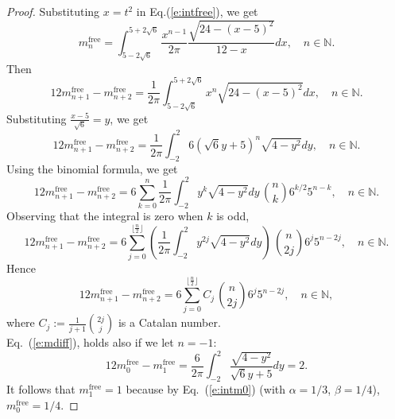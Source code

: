 \documentclass{amsart}
\newcommand{\N}{\mathbb N}
\theoremstyle{definition}
\begin{document}
\begin{proof}
Substituting   $x=t^2$ in Eq.(\ref{e:intfree}), we get
$$m_n^{\mathrm{free}}=\int_{5-2\sqrt{6}}^{5+2\sqrt{6}} \frac{x^{n-1}}{2\pi}\frac{\sqrt{24-(x-5)^2}}{12-x}dx,\quad n\in\N.$$
Then
$$12m_{n+1}^{\mathrm{free}}-m_{n+2}^{\mathrm{free}}=\frac{1}{2\pi}\int_{5-2\sqrt{6}}^{5+2\sqrt{6}} x^{n}\sqrt{24-(x-5)^2}dx,\quad n\in\N.$$
Substituting $\frac{x-5}{\sqrt{6}}=y$, we get
\begin{equation}\label{e:mdiff}
12m_{n+1}^{\mathrm{free}}-m_{n+2}^{\mathrm{free}}=\frac{1}{2\pi}\int_{-2}^{2} 6(\sqrt{6}y+5)^{n}\sqrt{4-y^2}dy,\quad n\in\N.
\end{equation}
Using the binomial formula, we get
$$12m_{n+1}^{\mathrm{free}}-m_{n+2}^{\mathrm{free}}=6\sum_{k=0}^{n}\frac{1}{2\pi}\int_{-2}^{2} y^k\sqrt{4-y^2}dy\, \binom{n}{k}6^{k/2}5^{n-k} ,\quad n\in\N.$$
Observing that the integral is zero when $k$ is odd,
$$12m_{n+1}^{\mathrm{free}}-m_{n+2}^{\mathrm{free}}=6\sum_{j=0}^{\lfloor\frac n 2 \rfloor}\left(\frac{1}{2\pi}\int_{-2}^{2} y^{2j}\sqrt{4-y^2}dy\right)\, \binom{n}{2j}6^{j}5^{n-2j} ,\quad n\in\N.$$
Hence
$$12m_{n+1}^{\mathrm{free}}-m_{n+2}^{\mathrm{free}}=6\sum_{j=0}^{\lfloor\frac n 2 \rfloor}C_j\, \binom{n}{2j}6^{j}5^{n-2j} ,\quad n\in\N,$$
where $C_j:=\frac{1}{j+1}\binom{2j}j$ is a Catalan number.\\
Eq.~(\ref{e:mdiff}), holds also  if we let $n=-1$:
$$12m_{0}^{\mathrm{free}}-m_{1}^{\mathrm{free}}=\frac{6}{2\pi}\int_{-2}^{2} \frac{\sqrt{4-y^2}}{\sqrt{6}y+5}dy=2.$$
It follows that $m^{\mathrm{free}}_1=1$ because by Eq.~(\ref{e:intm0}) (with $\alpha=1/3$, $\beta=1/4$),  $m^{\mathrm{free}}_0=1/4$.

\end{proof}
\end{document}
